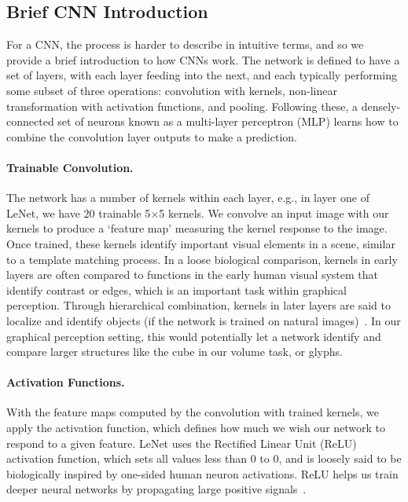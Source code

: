 \documentclass[journal]{vgtc}        %
\begin{document}
{\subsection{Brief CNN Introduction}
For a CNN, the process is harder to describe in intuitive terms, and so we provide a brief introduction to how CNNs work. The network is defined to have a set of layers, with each layer feeding into the next, and each typically performing some subset of three operations: convolution with kernels, non-linear transformation with activation functions, and pooling. Following these, a densely-connected set of neurons known as a multi-layer perceptron (MLP) learns how to combine the convolution layer outputs to make a prediction.

\paragraph{Trainable Convolution.} The network has a number of kernels within each layer, e.g., in layer one of LeNet, we have 20 trainable 5$\times$5 kernels. We convolve an input image with our kernels to produce a `feature map' measuring the kernel response to the image. Once trained, these kernels identify important visual elements in a scene, similar to a template matching process. In a loose biological comparison, kernels in early layers are often compared to functions in the early human visual system that identify contrast or edges, which is an important task within graphical perception. Through hierarchical combination, kernels in later layers are said to localize and identify objects (if the network is trained on natural images)~\cite{Zeiler2014}. In our graphical perception setting, this would potentially let a network identify and compare larger structures like the cube in our volume task, or glyphs.

\paragraph{Activation Functions.} With the feature maps computed by the convolution with trained kernels, we apply the activation function, which defines how much we wish our network to respond to a given feature. LeNet uses the Rectified Linear Unit (ReLU) activation function, which sets all values less than 0 to 0, and is loosely said to be biologically inspired by one-sided human neuron activations. ReLU helps us train deeper neural networks by propagating large positive signals~\cite{pmlr-v15-glorot11a}.

}
\end{document}
